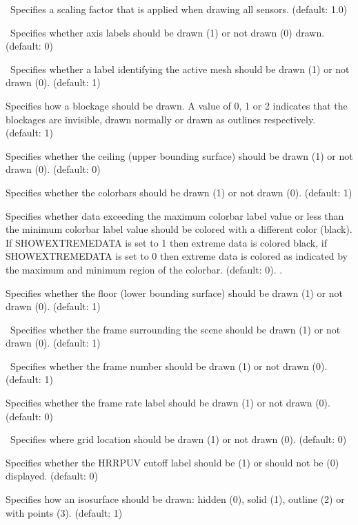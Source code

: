 \documentclass[11pt,twoside]{book}
\newcommand{\hitem}[1]{\item[{\bf #1} \hfill]}
\begin{document}
\hitem{SENSORRELSIZE}\ Specifies a scaling factor that is applied when
drawing all sensors.  (default: 1.0)

\hitem{SHOWAXISLABELS}\ Specifies whether axis labels should
be drawn (1) or not drawn (0) drawn. (default: 0)

\hitem{SHOWBLOCKLABEL}\ Specifies whether a label identifying the
active mesh should be drawn (1) or not drawn (0). (default: 1)

\hitem{SHOWBLOCKS}Specifies how a blockage should
be drawn.  A value of 0, 1 or 2 indicates that the blockages are
invisible, drawn normally or drawn as outlines respectively.  (default: 1)

\hitem{SHOWCADANDGRID}

\hitem{SHOWCEILING}Specifies whether
the ceiling (upper bounding surface) should be drawn (1) or not drawn (0).
(default: 0)


\hitem{SHOWCOLORBARS}Specifies whether
the colorbars should be drawn (1) or not drawn (0).
(default: 1)

\hitem{SHOWEXTREMEDATA}Specifies whether data exceeding the maximum colorbar
label value or less than the minimum colorbar label value should be colored
with a different color (black).  If SHOWEXTREMEDATA is set to 1 then extreme
data is colored black, if SHOWEXTREMEDATA is set to 0 then extreme data is
colored as indicated by the maximum and minimum region of the colorbar. (default: 0).  .

\hitem{SHOWFLOOR}Specifies whether
the floor (lower bounding surface) should be drawn (1) or not drawn
(0).
(default: 1)

\hitem{SHOWFRAME}\ Specifies whether the frame surrounding
the scene should be drawn (1) or not drawn (0). (default:
1)

\hitem{SHOWFRAMELABEL}\ Specifies whether the frame number
should be drawn (1) or not drawn (0). (default: 1)

\hitem{SHOWFRAMERATE}Specifies whether
the frame rate label should be drawn (1) or not drawn (0).
(default: 0)

\hitem{SHOWGRIDLOC}\ Specifies where grid location should be drawn (1) or not
drawn (0). (default: 0)

\hitem{SHOWHRRCUTOFF}Specifies whether the HRRPUV cutoff label should be (1)
or should not be (0) displayed. (default: 0)

\hitem{SHOWISO}Specifies how an isosurface should be drawn: hidden (0),
solid (1), outline (2) or with points (3).  (default: 1)
\end{document}

